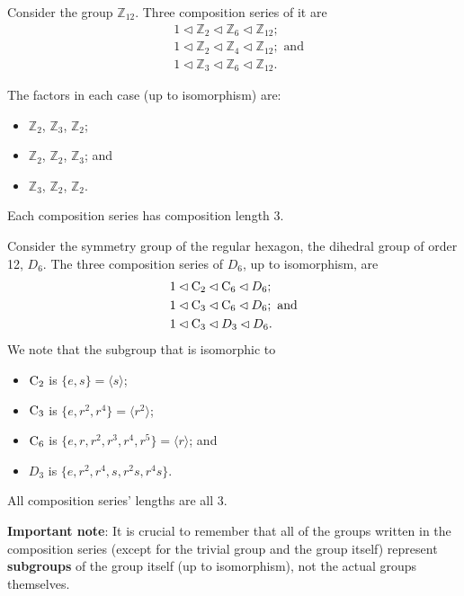 \begin{example}
    Consider the group $\mathbb{Z}_{12}$. Three composition series of it are
    \begin{align*}
        &1 \lhd \mathbb{Z}_2 \lhd \mathbb{Z}_6 \lhd \mathbb{Z}_{12};\\
        &1 \lhd \mathbb{Z}_2 \lhd \mathbb{Z}_4 \lhd \mathbb{Z}_{12}; \text{ and}\\
        &1 \lhd \mathbb{Z}_3 \lhd \mathbb{Z}_6 \lhd \mathbb{Z}_{12}.
    \end{align*}
    
    The factors in each case (up to isomorphism) are:
    \begin{itemize}
        \item $\mathbb{Z}_2$, $\mathbb{Z}_3$, $\mathbb{Z}_2$;
        \item $\mathbb{Z}_2$, $\mathbb{Z}_2$, $\mathbb{Z}_3$; and
        \item $\mathbb{Z}_3$, $\mathbb{Z}_2$, $\mathbb{Z}_2$.
    \end{itemize}
    Each composition series has composition length 3.
\end{example}

\begin{example}
    Consider the symmetry group of the regular hexagon, the dihedral group of order 12, $D_6$. The three composition series of $D_6$, up to isomorphism, are
    \begin{align*}
        &1 \lhd \mathrm{C}_{2} \lhd \mathrm{C}_{6} \lhd D_6;\\
        &1 \lhd \mathrm{C}_{3} \lhd \mathrm{C}_{6} \lhd D_6; \text{ and}\\
        &1 \lhd \mathrm{C}_{3} \lhd D_3 \lhd D_6.
    \end{align*}
    We note that the subgroup that is isomorphic to
    \begin{itemize}
        \item $\mathrm{C}_{2}$ is $\{e, s\} = \langle s \rangle$;
        \item $\mathrm{C}_{3}$ is $\{e, r^2, r^4\} = \langle r^2\rangle$;
        \item $\mathrm{C}_{6}$ is $\{e, r, r^2, r^3, r^4, r^5\} = \langle r\rangle$; and
        \item $D_3$ is $\{e, r^2, r^4, s, r^2s, r^4s\}$.
    \end{itemize}
    All composition series' lengths are all 3.
\end{example}
\textbf{Important note}: It is crucial to remember that all of the groups written in the composition series (except for the trivial group and the group itself) represent \textbf{subgroups} of the group itself (up to isomorphism), not the actual groups themselves.

